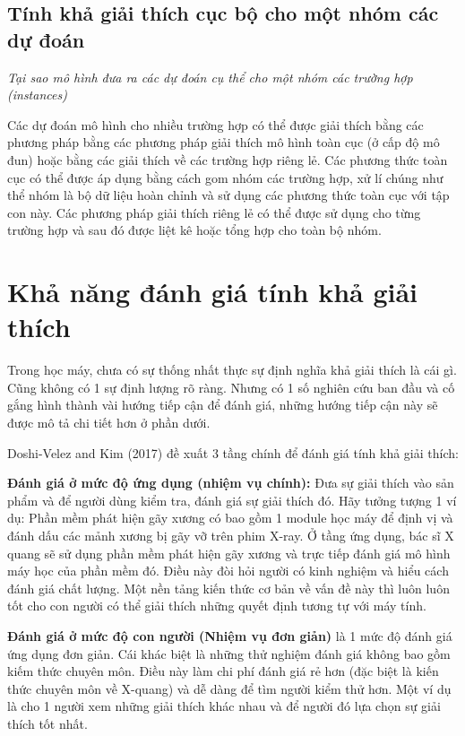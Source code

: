 \subsection{Tính khả giải thích cục bộ cho một nhóm các dự đoán}
\textit{Tại sao mô hình đưa ra các dự đoán cụ thể cho một nhóm các trường hợp (instances)}

Các dự đoán mô hình cho nhiều trường hợp có thể được giải thích bằng các phương pháp bằng các phương pháp giải thích mô hình toàn cục (ở cấp độ mô đun) hoặc bằng các giải thích về các trường hợp riêng lẻ. Các phương thức toàn cục có thể được áp dụng bằng cách gom nhóm các trường hợp, xử lí chúng như thể nhóm là bộ dữ liệu hoàn chỉnh và sử dụng các phương thức toàn cục với tập con này. Các phương pháp giải thích riêng lẻ có thể được sử dụng cho từng trường hợp và sau đó được liệt kê hoặc tổng hợp cho toàn bộ nhóm.

\clearpage

\section{Khả năng đánh giá tính khả giải thích}

Trong học máy, chưa có sự thống nhất thực sự định nghĩa khả giải thích là cái gì. Cũng không có 1 sự định lượng rõ ràng. Nhưng có 1 số nghiên cứu ban đầu và cố gắng hình thành vài hướng tiếp cận để đánh giá, những hướng tiếp cận này sẽ được mô tả chi tiết hơn ở phần dưới.

Doshi-Velez and Kim (2017) đề xuất 3 tầng chính để đánh giá tính khả giải thích:

\textbf{Đánh giá ở mức độ ứng dụng (nhiệm vụ chính):} Đưa sự giải thích vào sản phẩm và để người dùng kiểm tra, đánh giá sự giải thích đó. Hãy tưởng tượng 1 ví dụ: Phần mềm phát hiện gãy xương có bao gồm 1 module học máy để định vị và đánh dấu các mảnh xương bị gãy vỡ trên phim X-ray. Ở tầng ứng dụng, bác sĩ X quang sẽ sử dụng phần mềm phát hiện gãy xương và trực tiếp đánh giá mô hình máy học của phần mềm đó. Điều này đòi hỏi người có kinh nghiệm và hiểu cách đánh giá chất lượng. Một nền tảng kiến thức cơ bản về vấn đề này thì luôn luôn tốt cho con người có thể giải thích những quyết định tương tự với máy tính.

\textbf{Đánh giá ở mức độ con người (Nhiệm vụ đơn giản)} là 1 mức độ đánh giá ứng dụng đơn giản. Cái khác biệt là những thử nghiệm đánh giá không bao gồm kiếm thức chuyên môn. Điều này làm chi phí đánh giá rẻ hơn (đặc biệt là kiến thức chuyên môn về X-quang) và dễ dàng để tìm người kiểm thử hơn. Một ví dụ là cho 1 người xem những giải thích khác nhau và để người đó lựa chọn sự giải thích tốt nhất.

